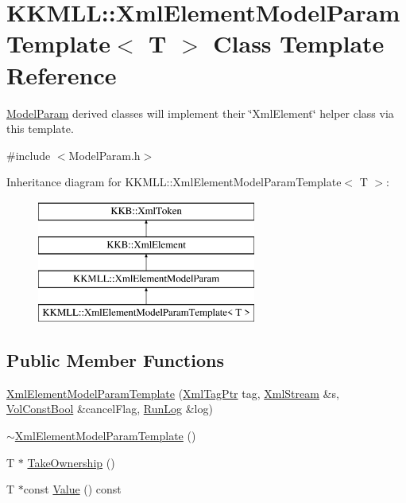 \hypertarget{class_k_k_m_l_l_1_1_xml_element_model_param_template}{}\section{K\+K\+M\+LL\+:\+:Xml\+Element\+Model\+Param\+Template$<$ T $>$ Class Template Reference}
\label{class_k_k_m_l_l_1_1_xml_element_model_param_template}


\hyperlink{class_k_k_m_l_l_1_1_model_param}{Model\+Param} derived classes will implement their \char`\"{}\+Xml\+Element\char`\"{} helper class via this template.  




{\ttfamily \#include $<$Model\+Param.\+h$>$}

Inheritance diagram for K\+K\+M\+LL\+:\+:Xml\+Element\+Model\+Param\+Template$<$ T $>$\+:\begin{figure}[H]
\begin{center}
\leavevmode
\includegraphics[height=4.000000cm]{class_k_k_m_l_l_1_1_xml_element_model_param_template}
\end{center}
\end{figure}
\subsection*{Public Member Functions}
\begin{DoxyCompactItemize}
\item 
\hyperlink{class_k_k_m_l_l_1_1_xml_element_model_param_template_adf5e663b95d9ffe5d22f8037db0de3b8}{Xml\+Element\+Model\+Param\+Template} (\hyperlink{namespace_k_k_b_a9253a3ea8a5da18ca82be4ca2b390ef0}{Xml\+Tag\+Ptr} tag, \hyperlink{class_k_k_b_1_1_xml_stream}{Xml\+Stream} \&s, \hyperlink{namespace_k_k_b_a7d390f568e2831fb76b86b56c87bf92f}{Vol\+Const\+Bool} \&cancel\+Flag, \hyperlink{class_k_k_b_1_1_run_log}{Run\+Log} \&log)
\item 
\hyperlink{class_k_k_m_l_l_1_1_xml_element_model_param_template_a9b97a7776ab106ff1c56e8626ec15502}{$\sim$\+Xml\+Element\+Model\+Param\+Template} ()
\item 
T $\ast$ \hyperlink{class_k_k_m_l_l_1_1_xml_element_model_param_template_a486a298e1812e246a0dd9e62c08b3a24}{Take\+Ownership} ()
\item 
T $\ast$const \hyperlink{class_k_k_m_l_l_1_1_xml_element_model_param_template_a45b7508c0165c72bfb25a724d8fd311f}{Value} () const 
\end{DoxyCompactItemize}
